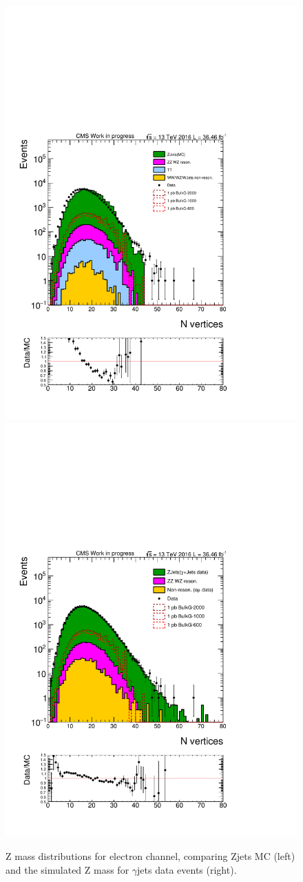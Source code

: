 \begin{figure}[htbp!]
\centering
\includegraphics[width=0.46\linewidth,page=8]{figures/MC2_Rc36p46DtReCalib_RhoWt_GMCEtaWt_tightzpt50_puWeightmoriondMC_metfilter_el_log_1pb.pdf}
\includegraphics[width=0.46\linewidth,page=8]{figures/GJets2_BkgSub_Rc36p46DtReCalib_NonReso_RhoWt_GMCEtaWt_tightzpt50_puWeightmoriondMC_muoneg_gjet_metfilter_el_log_1pb.pdf}
\caption{Z mass distributions for electron channel, comparing Zjets MC (left) and the simulated Z mass for $\gamma$jets data events (right).}
\label{fig:mz_el_zjets_gjets}
\end{figure}

